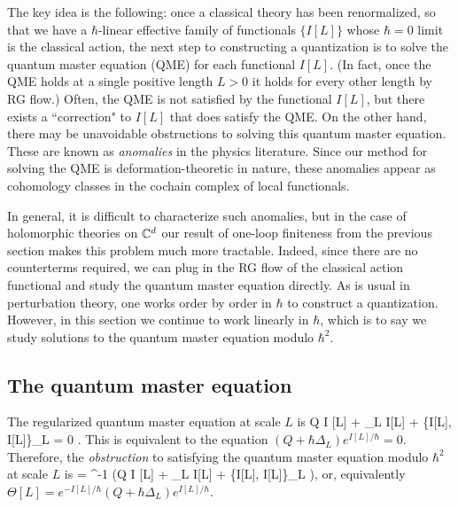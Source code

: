 \documentclass[10pt]{article}
\begin{document}
The key idea is the following: once a classical theory has been renormalized, so that we have a $\hbar$-linear effective family of functionals $\{I[L]\}$ whose $\hbar = 0$ limit is the classical action, the next step to constructing a quantization is to solve the quantum master equation (QME) for each functional $I[L]$. 
(In fact, once the QME holds at a single positive length $L>0$ it holds for every other length by RG flow.)
Often, the QME is not satisfied by the functional $I[L]$, but there exists a ``correction" to $I[L]$ that does satisfy the QME. 
On the other hand, there may be unavoidable obstructions to solving this quantum master equation.
These are known as {\em anomalies} in the physics literature. 
Since our method for solving the QME is deformation-theoretic in nature, these anomalies appear as cohomology classes in the cochain complex of local functionals. 

In general, it is difficult to characterize such anomalies, but in the case of holomorphic theories on $\mathbb C^d$ our result of one-loop finiteness from the previous section makes this problem much more tractable. 
Indeed, since there are no counterterms required, we can plug in the RG flow of the classical action functional and study the quantum master equation directly. 
As is usual in perturbation theory, one works order by order in $\hbar$ to construct a quantization.
However, in this section we continue to work linearly in $\hbar$, which is to say we study solutions to the quantum master equation modulo $\hbar^2$. 

\subsection{The quantum master equation}

The regularized quantum master equation at scale $L$ is 
\ben
Q I [L] + \hbar \Delta_L I[L] +  \{I[L], I[L]\}_L = 0 .
\een
This is equivalent to the equation $(Q + \hbar \Delta_L) e^{I[L]/\hbar} = 0$. 
Therefore, the {\em obstruction} to satisfying the quantum master equation modulo $\hbar^2$ at scale $L$ is
\ben
\Theta[L] = \hbar^{-1} \left(Q I [L] + \hbar \Delta_L I[L] +  \{I[L], I[L]\}_L \right),
\een
or, equivalently $\Theta[L] = e^{-I[L]/\hbar} (Q + \hbar\Delta_L)e^{I[L]/\hbar}$. 

\subsection{}
\end{document}
